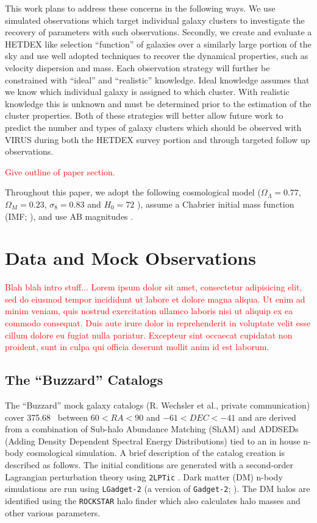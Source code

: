 \documentclass[fleqn,usenatbib]{mnras}
\newcommand{\editorial}[1]{\textcolor{red}{#1}}
\begin{document}
This work plans to address these concerns in the following ways. We use simulated observations which target individual galaxy clusters to investigate the recovery of parameters with such observations. Secondly, we create and evaluate a HETDEX like selection ``function'' of galaxies over a similarly large portion of the sky and use well adopted techniques to recover the dynamical properties, such as velocity dispersion and mass. Each observation strategy will further be constrained with ``ideal'' and ``realistic'' knowledge. Ideal knowledge assumes that we know which individual galaxy is assigned to which cluster. With realistic knowledge this is unknown and must be determined prior to the estimation of the cluster properties. Both of these strategies will better allow future work to predict the number and types of galaxy clusters which should be observed with VIRUS during both the HETDEX survey portion and through targeted follow up observations.

\editorial{Give outline of paper section.}

Throughout this paper, we adopt the following cosmological model ($\Omega_\Lambda = 0.77$,
$\Omega_M = 0.23$, $\sigma_8 = 0.83$ and $H_0= 72$ \kms \mpc), assume a Chabrier initial mass function (IMF; \citealt{Chabrier2003}), and use AB magnitudes \citep{Oke1974}.

\section{Data and Mock Observations}\label{sec: Data}

\editorial{Blah blah intro stuff... Lorem ipsum dolor sit amet, consectetur adipisicing elit, sed do eiusmod tempor incididunt ut labore et dolore magna aliqua. Ut enim ad minim veniam, quis nostrud exercitation ullamco laboris nisi ut aliquip ex ea commodo consequat. Duis aute irure dolor in reprehenderit in voluptate velit esse cillum dolore eu fugiat nulla pariatur. Excepteur sint occaecat cupidatat non proident, sunt in culpa qui officia deserunt mollit anim id est laborum.}

\subsection{The ``Buzzard'' Catalogs}
The ``Buzzard'' mock galaxy catalogs (R. Wechsler et al., private communication) cover 375.68 \degsq\ between $60 < RA < 90$ and $-61 < DEC < -41$ and are derived from a combination of Sub-halo Abundance Matching (ShAM) and ADDSEDs (Adding Density Dependent Spectral Energy Distributions) tied to an in house n-body cosmological simulation. A brief description of the catalog creation is described as follows. The initial conditions are generated with a second-order Lagrangian perturbation theory using {\tt 2LPTic} \citep{Crocce2006}. Dark matter (DM) n-body simulations are run using {\tt LGadget-2} (a version of {\tt Gadget-2}; \citealt{Springel2005}). The DM halos are identified using the {\tt ROCKSTAR} halo finder \citep{Behroozi2013} which also calculates halo masses and other various parameters. 
\end{document}
